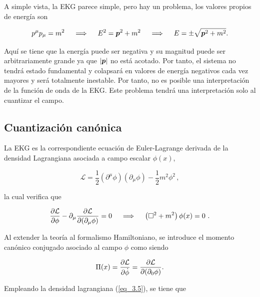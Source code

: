 A simple vista, la EKG parece simple, pero hay un problema, los valores propios de energía son

\begin{equation} 
    p^{\mu}p_{\mu} = m^{2} \quad \implies \quad E^{2}=\vb*{p}^{2}+m^{2}  \quad \implies \quad E = \pm  \sqrt{\vb*{p}^2+m^2}.
    \label{eq_3.4}
\end{equation}

Aquí se tiene que la energía puede ser negativa y su magnitud puede ser arbitrariamente grande ya que $\abs{\vb*{p}}$ no está acotado. Por tanto, el sistema no tendrá estado fundamental y colapsará en valores de energía negativos cada vez mayores y será totalmente inestable. Por tanto, no es posible una interpretación de la función de onda de la EKG. Este problema tendrá una interpretación solo al cuantizar el campo.

\subsection{Cuantización canónica}

La EKG es la correspondiente ecuación de Euler-Lagrange derivada de la densidad Lagrangiana asociada a campo escalar $\phi (x)$, 

\begin{equation}
	\boxed{
    \mathcal{L}=\frac{1}{2}\left( \partial ^{\mu }\phi \right) \left( \partial_{\mu }\phi \right) -\frac{1}{2}m^{2}\phi ^{2} } \, ,
    \label{eq_3.5}
\end{equation}

la cual verifica que

\begin{equation}
    \pdv{\mathcal{L}}{\phi}-\partial_{\mu}\pdv{\mathcal{L}}{\qty(\partial_\mu \phi)}=0 \quad \implies \quad \left(\square^{2}+m^{2}\right) \phi (x) = 0~.
\end{equation}

Al extender la teoría al formalismo Hamiltoniano, se introduce el momento canónico conjugado asociado al campo $\phi$ como siendo

\begin{equation}
    \Pi(x) = \pdv{\mathcal{L}}{\dot{\phi}} = \pdv{\mathcal{L}}{\qty(\partial _{0}\phi)}.
    \label{eq_3.6}
\end{equation}

Empleando la densidad lagrangiana (\ref{eq_3.5}), se tiene que


